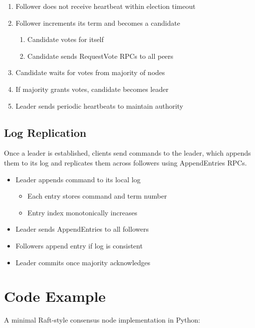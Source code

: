 \documentclass[12pt]{article}
\begin{document}
\begin{enumerate}
  \item Follower does not receive heartbeat within election timeout
  \item Follower increments its term and becomes a candidate
    \begin{enumerate}
      \item Candidate votes for itself
      \item Candidate sends RequestVote RPCs to all peers
    \end{enumerate}
  \item Candidate waits for votes from majority of nodes
  \item If majority grants votes, candidate becomes leader
  \item Leader sends periodic heartbeats to maintain authority
\end{enumerate}

\subsection{Log Replication}
Once a leader is established, clients send commands to the leader, which
appends them to its log and replicates them across followers using
AppendEntries RPCs.

\begin{itemize}
  \item Leader appends command to its local log
    \begin{itemize}
      \item Each entry stores command and term number
      \item Entry index monotonically increases
    \end{itemize}
  \item Leader sends AppendEntries to all followers
  \item Followers append entry if log is consistent
  \item Leader commits once majority acknowledges
\end{itemize}


\section{Code Example}
A minimal Raft-style consensus node implementation in Python:
\end{document}
